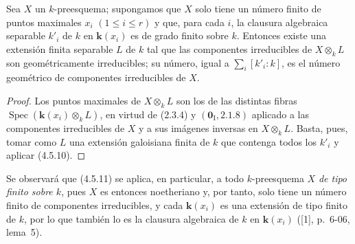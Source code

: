 \begin{corollary}[4.5.11]
Sea $X$ un $k$-preesquema; supongamos que $X$ solo tiene un número finito de
puntos maximales $x_i$ $(1\leqslant i\leqslant r)$ y que, para cada $i$, la
clausura algebraica separable $k'_i$ de $k$ en $\boldsymbol{k}(x_i)$ es de grado finito
sobre $k$. Entonces existe una extensión finita separable $L$ de $k$ tal que
las componentes irreducibles de $X\otimes_k L$ son geométricamente
irreducibles; su número, igual a $\sum_i[k'_i:k]$, es el número geométrico de
componentes irreducibles de $X$.
\end{corollary}

\begin{proof}
Los puntos maximales de $X\otimes_k L$ son los de las distintas fibras
$\operatorname{Spec}(\boldsymbol{k}(x_i)\otimes_k L)$, en virtud de (2.3.4) y
$(\mathbf{0}_{\mathrm I},2.1.8)$ aplicado a las componentes irreducibles de $X$ y a
sus imágenes inversas en $X\otimes_k L$. Basta, pues, tomar como $L$ una
extensión galoisiana finita de $k$ que contenga todos los $k'_i$ y aplicar
(4.5.10).
\end{proof}

Se observará que (4.5.11) se aplica, en particular, a todo $k$-preesquema
$X$ \emph{de tipo finito sobre $k$}, pues $X$ es entonces noetheriano y, por tanto,
solo tiene un número finito de componentes irreducibles, y cada $\boldsymbol{k}(x_i)$ es
una extensión de tipo finito de $k$, por lo que también lo es la clausura
algebraica de $k$ en $\boldsymbol{k}(x_i)$ ([1], p.~6-06, lema~5).

